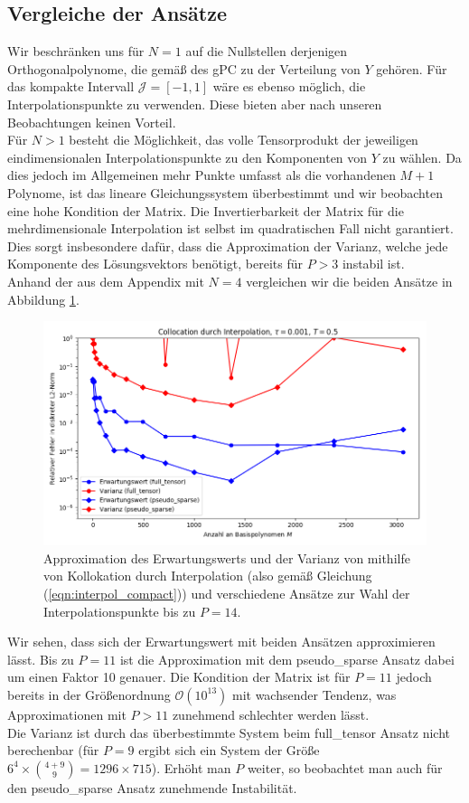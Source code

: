 \subsection{Vergleiche der Ansätze}
Wir beschränken uns für $N=1$ auf die Nullstellen derjenigen Orthogonalpolynome, die gemäß des gPC zu der Verteilung von $Y$ gehören. Für das kompakte Intervall $\mathcal{J}=[-1,1]$ wäre es ebenso möglich, die \chebyspace Interpolationspunkte zu verwenden. Diese bieten aber nach unseren Beobachtungen keinen Vorteil.\\
Für $N>1$ besteht die Möglichkeit, das volle Tensorprodukt der jeweiligen eindimensionalen Interpolationspunkte zu den Komponenten von $Y$ zu wählen. Da dies jedoch im Allgemeinen mehr Punkte umfasst als die vorhandenen $M+1$ Polynome, ist das lineare Gleichungssystem überbestimmt und wir beobachten eine hohe Kondition der Matrix. Die Invertierbarkeit der Matrix für die mehrdimensionale Interpolation ist selbst im quadratischen Fall nicht garantiert. Dies sorgt insbesondere dafür, dass die Approximation der Varianz, welche jede Komponente des Lösungsvektors benötigt, bereits für $P>3$ instabil ist.\\
Anhand der  aus dem Appendix mit $N=4$ vergleichen wir die beiden Ansätze in Abbildung \ref{fig:Kollokation_trial8}. 
\begin{figure}[!htb]
\centering
\includegraphics[width=\linewidth]{Figures/collocation_mi_trial8_ft_pseudosparse.png}
\caption{Approximation des Erwartungswerts und der Varianz von  mithilfe von Kollokation durch Interpolation (also gemäß Gleichung (\ref{eqn:interpol_compact})) und verschiedene Ansätze zur Wahl der Interpolationspunkte bis zu $P=14$.}
\label{fig:Kollokation_trial8}
\end{figure}
Wir sehen, dass sich der Erwartungswert mit beiden Ansätzen approximieren lässt. Bis zu $P=11$ ist die Approximation mit dem pseudo\_sparse Ansatz dabei um einen Faktor 10 genauer. Die Kondition der Matrix ist für $P=11$ jedoch bereits in der Größenordnung $\mathcal{O}(10^{13})$ mit wachsender Tendenz, was Approximationen mit $P>11$ zunehmend schlechter werden lässt.\\
Die Varianz ist durch das überbestimmte System beim full\_tensor Ansatz nicht berechenbar (für $P=9$ ergibt sich ein System der Größe $6^4\times \binom{4+9}{9} =1296\times 715$). Erhöht man $P$ weiter, so beobachtet man auch für den pseudo\_sparse Ansatz zunehmende Instabilität.


